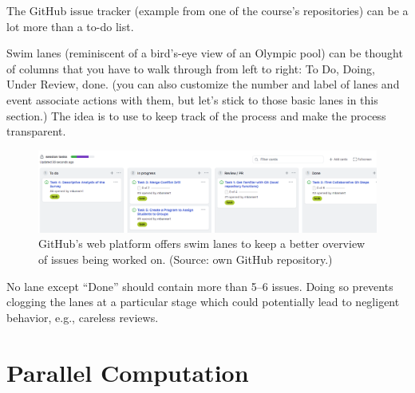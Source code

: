 \documentclass[
  12pt,
  letterpaper,
]{krantz}
\begin{document}
The GitHub issue tracker (example from one of the course's
repositories) can be a lot more than a to-do list.

Swim lanes (reminiscent of a bird's-eye view of an Olympic pool) can be
thought of columns that you have to walk through from left to right: To
Do, Doing, Under Review, done. (you can also customize the number and
label of lanes and event associate actions with them, but let's stick to
those basic lanes in this section.) The idea is to use to keep track of
the process and make the process transparent.

\begin{figure}

{\centering \includegraphics{./images/swim.png}

}

\caption{GitHub's web platform offers swim lanes to keep a better
overview of issues being worked on. (Source: own GitHub repository.)}

\end{figure}

\begin{tcolorbox}[enhanced jigsaw, left=2mm, arc=.35mm, colbacktitle=quarto-callout-tip-color!10!white, breakable, colframe=quarto-callout-tip-color-frame, bottomrule=.15mm, bottomtitle=1mm, colback=white, leftrule=.75mm, coltitle=black, toptitle=1mm, titlerule=0mm, title=\textcolor{quarto-callout-tip-color}{\faLightbulb}\hspace{0.5em}{Tip}, opacityback=0, rightrule=.15mm, toprule=.15mm, opacitybacktitle=0.6]

No lane except ``Done'' should contain more than 5--6 issues. Doing so
prevents clogging the lanes at a particular stage which could
potentially lead to negligent behavior, e.g., careless reviews.

\end{tcolorbox}

\hypertarget{parallel-computation}{%
\section{Parallel Computation}\label{parallel-computation}}
\end{document}
